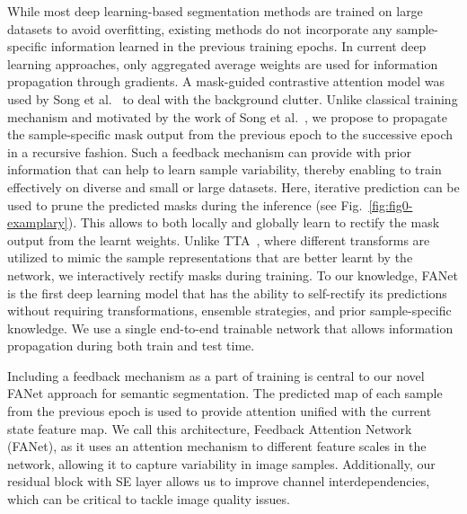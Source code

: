 \documentclass[journal]{IEEEtran}
\begin{document}
While most deep learning-based segmentation methods are trained on large datasets to avoid overfitting, existing methods do not incorporate any sample-specific information learned in the previous training epochs. In current deep learning approaches, only aggregated average weights are used for information propagation through gradients. A mask-guided contrastive attention model was used by Song et al.~\cite{Song_2018_CVPR} to deal with the background clutter. Unlike classical training mechanism and motivated by the work of Song et al.~\cite{Song_2018_CVPR}, we propose to propagate the sample-specific mask output from the previous epoch to the successive epoch in a recursive fashion. Such a feedback mechanism can provide with prior information that can help to learn sample variability, thereby enabling to train effectively on diverse and small or large datasets. Here, iterative prediction can be used to prune the predicted masks during the inference (see Fig.~\ref{fig:fig0-examplary}). This allows to both locally and globally learn to rectify the mask output from the learnt weights. Unlike \ac{TTA}~\cite{WANG201934}, where different transforms are utilized to mimic the sample representations that are better learnt by the network, we interactively rectify masks during training. To our knowledge, FANet is the first deep learning model that has the ability to self-rectify its predictions without requiring transformations, ensemble strategies, and prior sample-specific knowledge. We use a single end-to-end trainable network that allows information propagation during both train and test time.

Including a feedback mechanism as a part of training is central to our novel FANet approach for semantic segmentation. The predicted map of each sample from the previous epoch is used to provide attention unified with the current state feature map. We call this architecture,  Feedback Attention Network (FANet), as it uses an attention mechanism to different feature scales in the network, allowing it to capture variability in image samples. Additionally, our residual block with \ac{SE} layer allows us to improve channel interdependencies, which can be critical to tackle image quality issues. 
\end{document}
